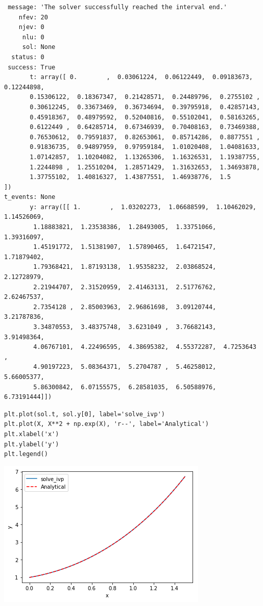 \documentclass[11pt]{article}
\begin{document}
\begin{verbatim}
 message: 'The solver successfully reached the interval end.'
    nfev: 20
    njev: 0
     nlu: 0
     sol: None
  status: 0
 success: True
       t: array([ 0.        ,  0.03061224,  0.06122449,  0.09183673,  0.12244898,
       0.15306122,  0.18367347,  0.21428571,  0.24489796,  0.2755102 ,
       0.30612245,  0.33673469,  0.36734694,  0.39795918,  0.42857143,
       0.45918367,  0.48979592,  0.52040816,  0.55102041,  0.58163265,
       0.6122449 ,  0.64285714,  0.67346939,  0.70408163,  0.73469388,
       0.76530612,  0.79591837,  0.82653061,  0.85714286,  0.8877551 ,
       0.91836735,  0.94897959,  0.97959184,  1.01020408,  1.04081633,
       1.07142857,  1.10204082,  1.13265306,  1.16326531,  1.19387755,
       1.2244898 ,  1.25510204,  1.28571429,  1.31632653,  1.34693878,
       1.37755102,  1.40816327,  1.43877551,  1.46938776,  1.5       ])
t_events: None
       y: array([[ 1.        ,  1.03202273,  1.06688599,  1.10462029,  1.14526069,
        1.18883821,  1.23538386,  1.28493005,  1.33751066,  1.39316097,
        1.45191772,  1.51381907,  1.57890465,  1.64721547,  1.71879402,
        1.79368421,  1.87193138,  1.95358232,  2.03868524,  2.12728979,
        2.21944707,  2.31520959,  2.41463131,  2.51776762,  2.62467537,
        2.7354128 ,  2.85003963,  2.96861698,  3.09120744,  3.21787836,
        3.34870553,  3.48375748,  3.6231049 ,  3.76682143,  3.91498364,
        4.06767101,  4.22496595,  4.38695382,  4.55372287,  4.7253643 ,
        4.90197223,  5.08364371,  5.2704787 ,  5.46258012,  5.66005377,
        5.86300842,  6.07155575,  6.28581035,  6.50588976,  6.73191444]])
\end{verbatim}

\begin{verbatim}
plt.plot(sol.t, sol.y[0], label='solve_ivp')
plt.plot(X, X**2 + np.exp(X), 'r--', label='Analytical')
plt.xlabel('x')
plt.ylabel('y')
plt.legend()
\end{verbatim}

\begin{center}
\includegraphics[width=.9\linewidth]{obipy-resources/744bcb3e58866fd0750c7a1efd9d42e8-181qOL.png}
\end{center}
\end{document}
